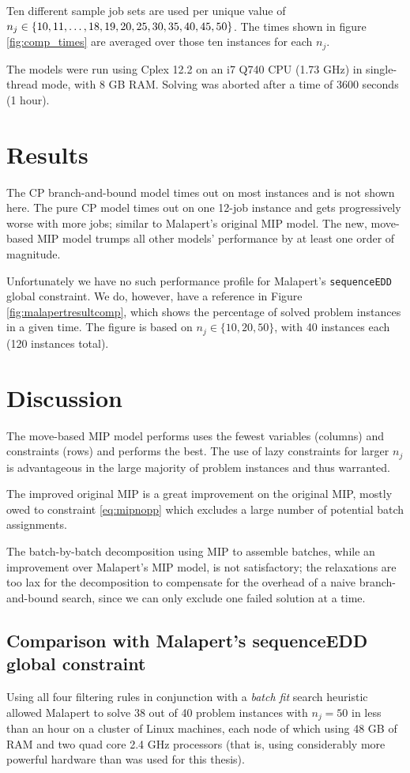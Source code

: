 \documentclass[13pt, letterpaper, oneside]{book}
\begin{document}
Ten different sample job sets are
used per unique value of $n_j \in \{10, 11, \dots, 18, 19, 20, 25,\\ 30, 35, 40, 45, 50\}$. The times shown in figure \ref{fig:comp_times}
are averaged over those ten instances for each $n_j$.

The models were run using Cplex 12.2 on an i7 Q740 CPU (1.73 GHz) in single-thread mode, with 8 GB RAM.
Solving was aborted after a time of 3600 seconds (1 hour).

\section{Results}
The CP branch-and-bound model times out on most instances and is not shown here.
The pure CP model times out on one 12-job instance and gets progressively worse
with more jobs; similar to Malapert's original MIP model.
 The new, move-based MIP model trumps all other
models' performance by at least one order of magnitude.

Unfortunately we have no such performance profile for Malapert's
\texttt{sequenceEDD} global constraint. We do, however, have a reference in
Figure \ref{fig:malapertresultcomp}, which shows the percentage of solved
problem instances in a given time. The figure is based on $n_j \in \{10, 20,
50\}$, with 40 instances each (120 instances total).


\section{Discussion}\label{sec:discussion}
The move-based MIP model performs uses the fewest variables (columns) and
constraints (rows) and performs the best. The use of lazy constraints for
larger $n_j$ is advantageous in the large majority of problem instances and thus
warranted. 

The improved original MIP is a great improvement on the original MIP, mostly
owed to constraint \eqref{eq:mipnopp} which excludes a large number of potential
batch assignments.

The batch-by-batch decomposition using MIP to assemble batches, while an
improvement over Malapert's MIP model, is not satisfactory; the relaxations are
too lax for the decomposition to compensate for the overhead of a naive
branch-and-bound search, since we can only exclude one failed solution at a
time.

\subsection{Comparison with Malapert's sequenceEDD global constraint}
Using all four filtering rules in conjunction with a \textit{batch fit} search
heuristic allowed Malapert to solve 38 out of 40 problem instances with $n_j =
50$ in less than an hour on a cluster of Linux machines, each node of which
using 48 GB of RAM and two quad core 2.4 GHz processors (that is, using
considerably more powerful hardware than was used for this thesis). 
\end{document}
